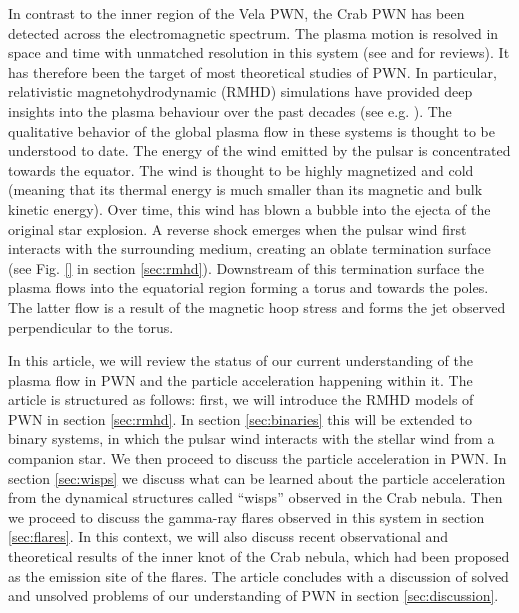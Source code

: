 In contrast to the inner region of the Vela PWN, the Crab PWN has been detected across the electromagnetic spectrum. The plasma motion is resolved in space and time with unmatched resolution in this system (see \citep{Hester_2008} and \citep{BuehlerBlandford2013a} for reviews). It has therefore been the target of most theoretical studies of PWN. In particular, relativistic magnetohydrodynamic (RMHD) simulations have provided deep insights into the plasma behaviour over the past decades (see e.g.  \citep{Komissarov_2004,Del_Zanna_2006,Porth_2013}). The qualitative behavior of the global plasma flow in these systems is thought to be understood to date. The energy of the wind emitted by the pulsar is concentrated towards the equator. The wind is thought to be highly magnetized and cold (meaning that its thermal energy is much smaller than its magnetic and bulk kinetic energy). Over time, this wind has blown a bubble into the ejecta of the original star explosion. A reverse shock emerges when the pulsar wind first interacts with the surrounding medium, creating an oblate termination surface (see {\cred Fig. \ref{}} in section \ref{sec:rmhd}). Downstream of this termination surface the plasma flows into the equatorial region forming a torus and towards the poles. The latter flow is a result of the magnetic hoop stress and forms the jet observed perpendicular to the torus.

In this article, we will review the status of our current understanding of the plasma flow in PWN and the particle acceleration happening within it.  The article is structured as follows: first, we will introduce the RMHD models of PWN in section \ref{sec:rmhd}. In section \ref{sec:binaries} this will be extended to binary systems, in which the pulsar wind interacts with the stellar wind from a companion star. We then proceed to discuss the particle acceleration in PWN. In section \ref{sec:wisps} we discuss what can be learned about the particle acceleration from the dynamical structures called ``wisps'' observed in the Crab nebula. Then we proceed to discuss the gamma-ray flares observed in this system in section \ref{sec:flares}. In this context, we will also discuss recent observational and theoretical results of the inner knot of the Crab nebula, which had been proposed as the emission site of the flares. The article concludes with a discussion of solved and unsolved problems of our understanding of PWN in section \ref{sec:discussion}.